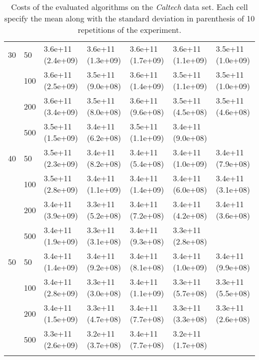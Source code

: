 \begin{longtable}{lllllll}
 \midrule
30 & 50  &  3.6e+11 (2.4e+09) &  3.6e+11 (1.3e+09) &  3.6e+11 (1.7e+09) &    3.6e+11 (1.1e+09) &  3.5e+11 (1.0e+09) \\
   & 100 &  3.6e+11 (2.5e+09) &  3.5e+11 (9.0e+08) &  3.6e+11 (1.4e+09) &    3.5e+11 (1.1e+09) &  3.5e+11 (1.0e+09) \\
   & 200 &  3.6e+11 (3.4e+09) &  3.5e+11 (8.0e+08) &  3.6e+11 (9.6e+08) &    3.5e+11 (4.5e+08) &  3.5e+11 (4.6e+08) \\
   & 500 &  3.5e+11 (1.5e+09) &  3.4e+11 (6.2e+08) &  3.5e+11 (1.1e+09) &    3.4e+11 (9.0e+08) &       \\
 \midrule
40 & 50  &  3.5e+11 (2.3e+09) &  3.4e+11 (8.2e+08) &  3.4e+11 (5.4e+08) &    3.4e+11 (1.0e+09) &  3.4e+11 (7.9e+08) \\
   & 100 &  3.5e+11 (2.8e+09) &  3.4e+11 (1.1e+09) &  3.4e+11 (1.4e+09) &    3.4e+11 (6.0e+08) &  3.4e+11 (3.1e+08) \\
   & 200 &  3.4e+11 (3.9e+09) &  3.3e+11 (5.2e+08) &  3.4e+11 (7.2e+08) &    3.4e+11 (4.2e+08) &  3.4e+11 (3.6e+08) \\
   & 500 &  3.4e+11 (1.9e+09) &  3.3e+11 (3.1e+08) &  3.4e+11 (9.3e+08) &    3.3e+11 (2.8e+08) &       \\
 \midrule
50 & 50  &  3.4e+11 (1.4e+09) &  3.4e+11 (9.2e+08) &  3.4e+11 (8.1e+08) &    3.4e+11 (1.0e+09) &  3.4e+11 (9.9e+08) \\
   & 100 &  3.4e+11 (2.8e+09) &  3.3e+11 (3.0e+08) &  3.4e+11 (1.1e+09) &    3.3e+11 (5.7e+08) &  3.3e+11 (5.5e+08) \\
   & 200 &  3.4e+11 (1.5e+09) &  3.3e+11 (4.7e+08) &  3.4e+11 (7.7e+08) &    3.3e+11 (3.3e+08) &  3.3e+11 (2.6e+08) \\
   & 500 &  3.3e+11 (2.6e+09) &  3.2e+11 (3.7e+08) &  3.4e+11 (7.7e+08) &    3.2e+11 (1.7e+08) &                 \\
\bottomrule
\caption{Costs of the evaluated algorithms on the \textit{Caltech} data set. Each cell specify the mean along with the standard deviation in parenthesis of 10 repetitions of the experiment.}
\label{tab:real-cost-mean-std-caltech}
\end{longtable}

